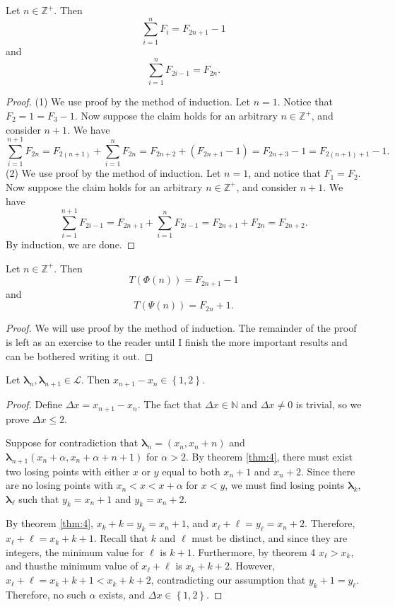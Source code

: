 \documentclass[11pt, letterpaper]{article}
\begin{document}
\begin{lemma}\label{lma:2}
	Let $n\in\mathbb{Z}^+$. Then
	\[
		\sum_{i=1}^{n} F_{i}=F_{2n+1}-1
	\]
	and
	\[
		\sum_{i=1}^{n} F_{2i-1}=F_{2n}
	.\]
	
\end{lemma}
\begin{proof}
	(1) We use proof by the method of induction. Let $n=1$. Notice that $F_2=1=F_3-1$. Now suppose the claim holds for an arbitrary $n\in\mathbb{Z}^+$, and consider $n+1$. We have
	\[
		\sum_{i=1}^{n+1} F_{2n}=F_{2(n+1)}+\sum_{i=1}^{n} F_{2n}=F_{2n+2}+\left( F_{2n+1}-1 \right) =F_{2n+3}-1=F_{2(n+1)+1}-1
	.\]
	(2) We use proof by the method of induction. Let $n=1$, and notice that $F_1=F_2$. Now suppose the claim holds for an arbitrary $n\in\mathbb{Z}^+$, and consider $n+1$. We have
	\[
		\sum_{i=1}^{n+1} F_{2i-1}=F_{2n+1}+\sum_{i=1}^{n} F_{2i-1}=F_{2n+1}+F_{2n}=F_{2n+2}
	.\]
	By induction, we are done.
\end{proof}
\begin{lemma}\label{lma:3}
	Let $n\in\mathbb{Z}^+$. Then
	\[
		T(\Phi (n))=F_{2n+1}-1
	\]
	and
	\[
		T(\Psi (n))=F_{2n}+1
	.\]
\end{lemma}
\begin{proof}
	We will use proof by the method of induction. The remainder of the proof is left as an exercise to the reader until I finish the more important results and can be bothered writing it out.
\end{proof}
\begin{lemma}\label{lma:4}
	Let $\boldsymbol{\lambda }_n,\boldsymbol{\lambda } _{n+1}\in \mathcal{L}  $. Then $x_{n+1}-x_n\in\left\{ 1,2 \right\} $.
\end{lemma}
\begin{proof}
	Define $\Delta x=x_{n+1}-x_n$. The fact that $\Delta x\in\mathbb{N}$ and $\Delta x\neq 0$ is trivial, so we prove $\Delta x\leq 2$.

	Suppose for contradiction that $\boldsymbol{\lambda }_n=(x_n,x_n+n)$ and $\boldsymbol{\lambda } _{n+1}(x_n+\alpha ,x_n+\alpha +n+1 )$ for $\alpha >2$. By theorem \ref{thm:4}, there must exist two losing points with either $x$ or $y$ equal to both $x_n+1$ and $x_n+2$. Since there are no losing points with $x_n < x < x+\alpha $ for $x<y$, we must find losing points $\boldsymbol{\lambda } _k$, $\boldsymbol{\lambda } _\ell $ such that $y_k=x_n+1$ and $y_k=x_n+2$.

	By theorem \ref{thm:4}, $x_k+k=y_k=x_n+1$, and $x_\ell +\ell =y_\ell =x_n+2$. Therefore, $x_\ell +\ell =x_k+k+1$. Recall that $k$ and $\ell $ must be distinct, and since they are integers, the minimum value for $\ell $ is $k+1$. Furthermore, by theorem 4 $x_\ell >x_k$, and thusthe minimum value of $x_\ell +\ell $ is $x_k+k+2$. However, $x_\ell +\ell =x_k+k+1<x_k+k+2$, contradicting our assumption that $y_k+1=y_\ell $. Therefore, no such $\alpha $ exists, and $\Delta x\in\left\{ 1,2 \right\} $.
\end{proof}
\end{document}
